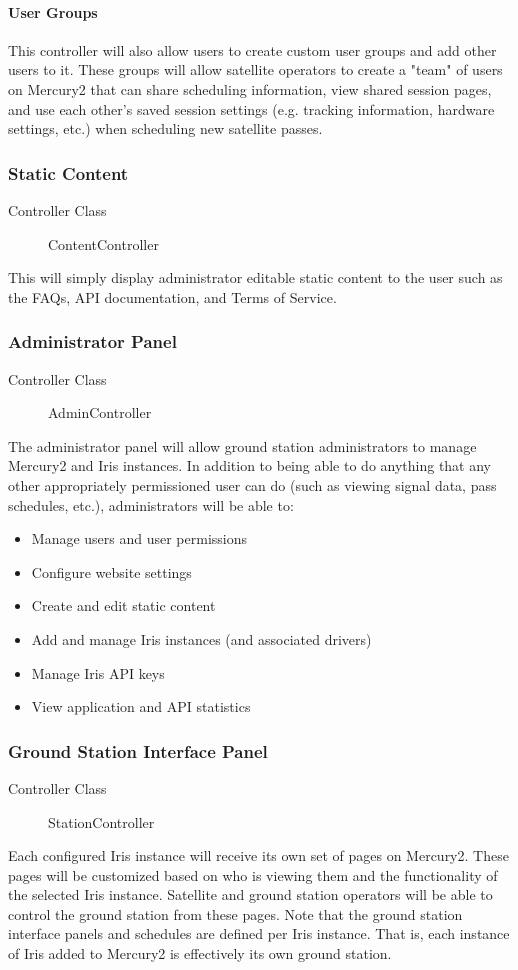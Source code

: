 \documentclass{mxl-note}
\begin{document}
\paragraph{User Groups}
This controller will also allow users to create custom user groups and add other users to it. These groups will allow satellite operators to create a "team" of users on Mercury2 that can share scheduling information, view shared session pages, and use each other's saved session settings (e.g. tracking information, hardware settings, etc.) when scheduling new satellite passes.

\subsubsection{Static Content}
\begin{description}
	\item [Controller Class]ContentController
\end{description}
This will simply display administrator editable static content to the user such as the FAQs, API documentation, and Terms of Service.

\subsubsection{Administrator Panel}
\begin{description}
	\item [Controller Class]AdminController
\end{description}
The administrator panel will allow ground station administrators to manage Mercury2 and Iris instances. In addition to being able to do anything that any other appropriately permissioned user can do (such as viewing signal data, pass schedules, etc.), administrators will be able to:
\begin{itemize}
	\item Manage users and user permissions
	\item Configure website settings
	\item Create and edit static content
	\item Add and manage Iris instances (and associated drivers)
	\item Manage Iris API keys
	\item View application and API statistics
\end{itemize}

\subsubsection{Ground Station Interface Panel}
\begin{description}
	\item [Controller Class]StationController
\end{description}
Each configured Iris instance will receive its own set of pages on Mercury2. These pages will be customized based on who is viewing them and the functionality of the selected Iris instance. Satellite and ground station operators will be able to control the ground station from these pages. Note that the ground station interface panels and schedules are defined per Iris instance. That is, each instance of Iris added to Mercury2 is effectively its own ground station.
\end{document}
